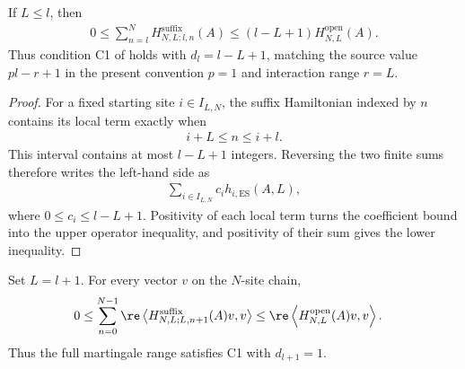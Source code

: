 \begin{lemma}
    \label{thm:open_parent_hamiltonian_es_c1}
    \leanok
    If $L\leq l$, then
    \begin{align}
        0
        \leq \sum_{n=l}^{N}H^{\mathrm{suffix}}_{N,L;l,n}(A)
        \leq (l-L+1)H^{\mathrm{open}}_{N,L}(A).
        \label{eq:open_parent_hamiltonian_es_c1}
    \end{align}
    Thus condition C1 of
    \cite{Nachtergaele1996Spectral} holds with $d_l=l-L+1$, matching
    the source value $pl-r+1$ in the present convention $p=1$ and
    interaction range $r=L$.
\end{lemma}

\begin{proof}
    \leanok
    For a fixed starting site $i\in I_{L,N}$, the suffix Hamiltonian indexed by $n$
    contains its local term exactly when
    \begin{align}
        i+L\leq n\leq i+l.
    \end{align}
    This interval contains at most $l-L+1$ integers. Reversing the two finite
    sums therefore writes the left-hand side as
    \begin{align}
        \sum_{i\in I_{L,N}}c_i h_{i,\mathrm{ES}}(A,L),
    \end{align}
    where $0\leq c_i\leq l-L+1$. Positivity of each local term turns the
    coefficient bound into the upper operator inequality, and positivity of their
    sum gives the lower inequality.
\end{proof}

\begin{lemma}
    \label{thm:open_parent_hamiltonian_c1_full_range}
    \leanok
    Set $L=l+1$.  For every vector $v$ on the $N$-site chain,
    \begin{align}
        0
         & \leq \sum_{n=0}^{N-1}
        \re\left\langle H^{\mathrm{suffix}}_{N,L;L,n+1}(A)v,v\right\rangle
        \leq
        \re\left\langle H^{\mathrm{open}}_{N,L}(A)v,v\right\rangle.
        \label{eq:open_parent_hamiltonian_c1_full_range}
    \end{align}
    Thus the full martingale range satisfies C1 with $d_{l+1}=1$.
\end{lemma}

